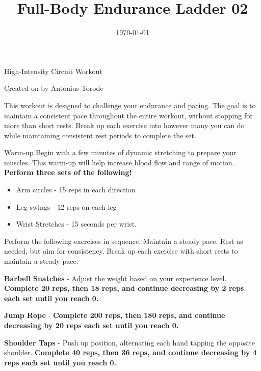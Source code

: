 \documentclass{article}
\newcounter{workout}
\newcounter{exercise}
\renewcommand{\maketitle}{
	\begin{center}
		{\Huge\bfseries\thetitle}
		
		\vspace{0.5em}
		
		High-Intensity Circuit Workout
		
		\vspace{0.5em}
		
		Created on \thedate\hspace{0.5em}by Antonius Torode
	\end{center}
}
\begin{document}
	\begin{tcolorbox}[colback=gray!15,colframe=black,enforce breakable,pad at break*=5mm,boxrule=0.5mm]
		
		\title{Full-Body Endurance Ladder 02}
		\date{\today}
		\maketitle
		
		This workout is designed to challenge your endurance and pacing. The goal is to maintain a consistent pace throughout the entire workout, without stopping for more than short rests. Break up each exercise into however many you can do while maintaining consistent rest periods to complete the set. 
		
		\begin{workoutbox}{Warm-up}
			Begin with a few minutes of dynamic stretching to prepare your muscles. This warm-up will help increase blood flow and range of motion. \textbf{Perform three sets of the following!}
			
			\begin{itemize}[label=\textcolor{blue!70}{\textbullet}, itemsep=0pt]
				\item Arm circles - 15 reps in each direction
				\item Leg swings - 12 reps on each leg
				\item Wrist Stretches - 15 seconds per wrist.
			\end{itemize}
		\end{workoutbox}
		
		Perform the following exercises in sequence. Maintain a steady pace. Rest as needed, but aim for consistency. Break up each exercise with short rests to maintain a steady pace.
		
		\begin{exercisebox}
			\textbf{Barbell Snatches} - Adjust the weight based on your experience level. \textbf{Complete 20 reps, then 18 reps, and continue decreasing by 2 reps each set until you reach 0.}
		\end{exercisebox}
		
		\begin{exercisebox}
			\textbf{Jump Rope} - \textbf{Complete 200 reps, then 180 reps, and continue decreasing by 20 reps each set until you reach 0.}
		\end{exercisebox}
		
		\begin{exercisebox}
			\textbf{Shoulder Taps} - Push up position, alternating each hand tapping the opposite shoulder. \textbf{Complete 40 reps, then 36 reps, and continue decreasing by 4 reps each set until you reach 0.}
		\end{exercisebox}
		

\end{tcolorbox}
\end{document}
